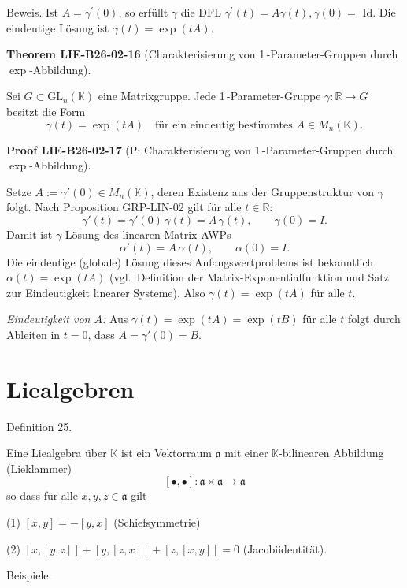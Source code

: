 \documentclass[10pt, letterpaper]{article}
\newcommand{\GL}{\mathrm{GL}}
\newcommand{\CustomHeading}[3]{%
  \par\medskip\noindent%
  \textbf{#1 #2} \textnormal{(#3)}.\enskip%
}
\newenvironment{THEO}[2]{\begin{unitbox}\CustomHeading{Theorem}{#1}{#2}}{\end{unitbox}}
\newenvironment{PROOF}[2]{\begin{unitbox}\CustomHeading{Proof}{#1}{#2}}{\end{unitbox}}
\begin{document}
Beweis. Ist $A=\gamma^{\prime}(0)$, so erfüllt $\gamma$ die DFL $\gamma^{\prime}(t)=A \gamma(t), \gamma(0)=$ Id. Die eindeutige Lösung ist $\gamma(t)=\exp (t A)$.



\begin{THEO}{LIE-B26-02-16}{Charakterisierung von 1\,-Parameter-Gruppen durch $\exp$-Abbildung}
Sei $G\subset \GL_n(\mathbb{K})$ eine Matrixgruppe. Jede 1\,-Parameter-Gruppe 
$\gamma:\mathbb{R}\to G$ besitzt die Form
\[
\gamma(t)=\exp(tA)\quad\text{für ein eindeutig bestimmtes }A\in M_n(\mathbb{K}).
\]
\end{THEO}



\begin{PROOF}{LIE-B26-02-17}{P: Charakterisierung von 1\,-Parameter-Gruppen durch $\exp$-Abbildung}
Setze $A:=\gamma'(0)\in M_n(\mathbb{K})$, deren Existenz aus der
Gruppenstruktur von $\gamma$ folgt. Nach Proposition \textsc{GRP-LIN-02} gilt für alle $t\in\mathbb{R}$:
\[
\gamma'(t)=\gamma'(0)\,\gamma(t)=A\,\gamma(t),\qquad \gamma(0)=I.
\]
Damit ist $\gamma$ Lösung des linearen Matrix-AWPs
\[
\alpha'(t)=A\,\alpha(t),\qquad \alpha(0)=I.
\]
Die eindeutige (globale) Lösung dieses Anfangswertproblems ist bekanntlich
$\alpha(t)=\exp(tA)$ (vgl.\ Definition der Matrix-Exponentialfunktion und
Satz zur Eindeutigkeit linearer Systeme). Also $\gamma(t)=\exp(tA)$ für alle $t$.

\emph{Eindeutigkeit von $A$:}
Aus $\gamma(t)=\exp(tA)=\exp(tB)$ für alle $t$ folgt durch Ableiten in $t=0$,
dass $A=\gamma'(0)=B$.
\end{PROOF}



\pagebreak


\section{Liealgebren}


Definition 25. 

Eine Liealgebra über $\mathbb{K}$ ist ein Vektorraum $\mathfrak{a}$ mit einer $\mathbb{K}$-bilinearen Abbildung (Lieklammer)
$$
[\bullet, \bullet]: \mathfrak{a} \times \mathfrak{a} \rightarrow \mathfrak{a}
$$
so dass für alle $x, y, z \in \mathfrak{a}$ gilt

(1) $[x, y]=-[y, x]$ (Schiefsymmetrie)

(2) $[x,[y, z]]+[y,[z, x]]+[z,[x, y]]=0$ (Jacobiidentität).

Beispiele:
\end{document}
